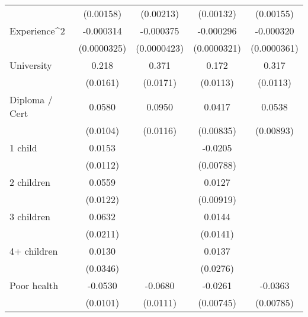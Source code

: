 {\begin{tabular}{l*{4}{c}}
                    &   (0.00158)         &   (0.00213)         &   (0.00132)         &   (0.00155)         \\
[1em]
Experience^{2}      &   -0.000314\sym{***}&   -0.000375\sym{***}&   -0.000296\sym{***}&   -0.000320\sym{***}\\
                    & (0.0000325)         & (0.0000423)         & (0.0000321)         & (0.0000361)         \\
[1em]
University          &       0.218\sym{***}&       0.371\sym{***}&       0.172\sym{***}&       0.317\sym{***}\\
                    &    (0.0161)         &    (0.0171)         &    (0.0113)         &    (0.0113)         \\
[1em]
Diploma / Cert      &      0.0580\sym{***}&      0.0950\sym{***}&      0.0417\sym{***}&      0.0538\sym{***}\\
                    &    (0.0104)         &    (0.0116)         &   (0.00835)         &   (0.00893)         \\
[1em]
1 child             &      0.0153         &                     &     -0.0205\sym{**} &                     \\
                    &    (0.0112)         &                     &   (0.00788)         &                     \\
[1em]
2 children          &      0.0559\sym{***}&                     &      0.0127         &                     \\
                    &    (0.0122)         &                     &   (0.00919)         &                     \\
[1em]
3 children          &      0.0632\sym{**} &                     &      0.0144         &                     \\
                    &    (0.0211)         &                     &    (0.0141)         &                     \\
[1em]
4+ children         &      0.0130         &                     &      0.0137         &                     \\
                    &    (0.0346)         &                     &    (0.0276)         &                     \\
[1em]
Poor health         &     -0.0530\sym{***}&     -0.0680\sym{***}&     -0.0261\sym{***}&     -0.0363\sym{***}\\
                    &    (0.0101)         &    (0.0111)         &   (0.00745)         &   (0.00785)         \\

\end{tabular}}
